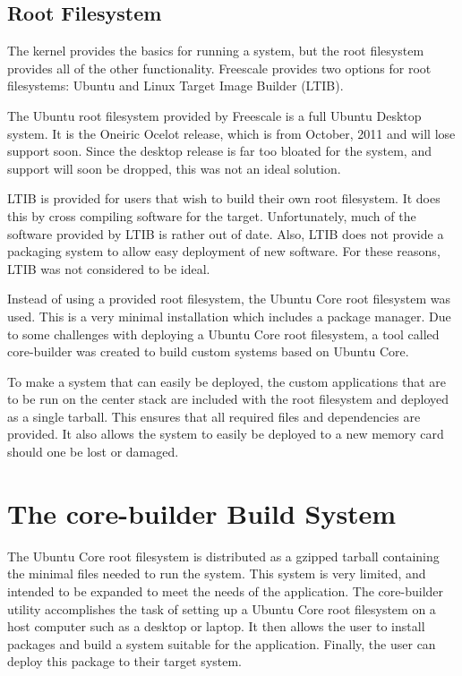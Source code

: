 \documentclass[ece]{uw-wkrpt}
\begin{document}
\subsection{Root Filesystem}

The kernel provides the basics for running a system, but the root filesystem
provides all of the other functionality. Freescale provides two options for root
filesystems: Ubuntu and Linux Target Image Builder (LTIB).

The Ubuntu root filesystem provided by Freescale is a full Ubuntu Desktop
system. It is the Oneiric Ocelot release, which is from October, 2011 and will
lose support soon. Since the desktop release is far too bloated for the system,
and support will soon be dropped, this was not an ideal solution.

LTIB is provided for users that wish to build their own root filesystem. It does
this by cross compiling software for the target. Unfortunately, much of the
software provided by LTIB is rather out of date. Also, LTIB does not provide a
packaging system to allow easy deployment of new software. For these reasons,
LTIB was not considered to be ideal.

Instead of using a provided root filesystem, the Ubuntu Core root filesystem was
used. This is a very minimal installation which includes a package manager. Due
to some challenges with deploying a Ubuntu Core root filesystem, a tool called
core-builder was created to build custom systems based on Ubuntu Core.

To make a system that can easily be deployed, the custom applications that are
to be run on the center stack are included with the root filesystem and deployed
as a single tarball. This ensures that all required files and dependencies are
provided. It also allows the system to easily be deployed to a new memory card
should one be lost or damaged.

\section{The core-builder Build System}

The Ubuntu Core root filesystem is distributed as a gzipped tarball containing
the minimal files needed to run the system. This system is very limited, and
intended to be expanded to meet the needs of the application. The core-builder
utility accomplishes the task of setting up a Ubuntu Core root filesystem on a
host computer such as a desktop or laptop. It then allows the user to install
packages and build a system suitable for the application. Finally, the user can
deploy this package to their target system.
\end{document}
